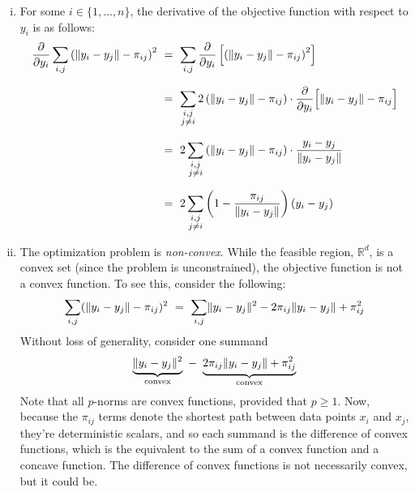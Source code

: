 \documentclass[twoside,11pt]{homework}
\DeclarePairedDelimiter{\2norm}{\lVert}{\rVert^2_2}
\newcommand{\1}[1]{\mathds{1}\left[#1\right]}
\DeclarePairedDelimiter{\norm}{\lVert}{\rVert}
\begin{document}
\begin{enumerate}[(i)]

\item For some $i \in \{1, \dots, n\}$, the derivative of the objective function with respect to $y_i$ is as follows:
\begin{align*}
\frac{\partial}{\partial y_i}\sum_{i,j}\left(\norm{y_i - y_j} - \pi_{ij}\right)^2 \ &= \ \sum_{i,j}\frac{\partial}{\partial y_i}\left[\left(\norm{y_i - y_j} - \pi_{ij}\right)^2\right]\\[0.7em]
&= \ \sum_{\substack{i, j \\ j\neq i}} 2\left(\norm{y_i - y_j} - \pi_{ij}\right) \cdot \frac{\partial}{\partial y_i}\Big[\norm{y_i - y_j} - \pi_{ij}\Big]\\[0.7em]
&= \ 2\sum_{\substack{i, j \\ j\neq i}}\left(\norm{y_i - y_j} - \pi_{ij}\right) \cdot \frac{y_i - y_j}{\norm{y_i - y_j}}\\[0.7em]
&= \ 2\sum_{\substack{i, j \\ j\neq i}}\left(1 - \frac{\pi_{ij}}{\norm{y_i - y_j}} \right) (y_i - y_j)
\end{align*}


\item The optimization problem is \textit{non-convex}. While the feasible region, $\mathbb{R}^d$, is a convex set (since the problem is unconstrained), the objective function is not a convex function. To see this, consider the following:
$$\sum_{i,j}(\norm{y_i - y_j} - \pi_{ij})^2 \ = \ \sum_{i,j} \norm{y_i - y_j}^2 - 2\pi_{ij}\norm{y_i - y_j} + \pi_{ij}^2$$
Without loss of generality, consider one summand
$$\underbrace{\norm{y_i - y_j}^2}_{\text{convex}} \ - \ \underbrace{2\pi_{ij}\norm{y_i - y_j} + \pi_{ij}^2}_{\text{convex}}$$
Note that all $p$-norms are convex functions, provided that $p \geq 1$. Now, because the $\pi_{ij}$ terms denote the shortest path between data points $x_i$ and $x_j$, they're deterministic scalars, and so each summand is the difference of convex functions, which is the equivalent to the sum of a convex function and a concave function. The difference of convex functions is not necessarily convex, but it could be.


\end{enumerate}
\end{document}
